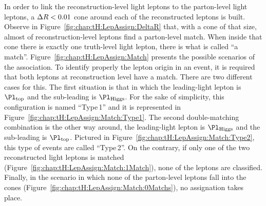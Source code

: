 In order to link the reconstruction-level light leptons to the parton-level light leptons, a \(\Delta R < 0.01\) cone around
each of the reconstructed leptons is built. Observe in Figure~\ref{fig:chap:tH:LepAssign:DeltaR} that, with a cone
of that size, almost of reconstruction-level leptons find a parton-level match.
When inside that cone there is exactly one truth-level light lepton,
there is what is called ``a match''. Figure~\ref{fig:chap:tH:LepAssign:Match} presents the possible scenarios
of the association. To identify properly the lepton origin in an event, it is required that both leptons
at reconstruction level have a match. There are two different cases for this.
The first situation is that in which the leading-light lepton is $\Pl_{\text{top}}$ and the sub-leading is $\Pl_{\text{Higgs}}$. For the 
sake of simplicity, this configuration is named ``Type$\,$1'' and it is represented in Figure~\ref{fig:chap:tH:LepAssign:Match:Type1}.
The second double-matching combination is the other way around, the leading-light lepton is $\Pl_{\text{Higgs}}$ and the sub-leading 
is $\Pl_{\text{top}}$. Pictured in Figure~\ref{fig:chap:tH:LepAssign:Match:Type2}, this type of events are called ``Type$\,$2''.
On the contrary, if only one of the two reconstructed light leptons is matched (Figure~\ref{fig:chap:tH:LepAssign:Match:1Match}),
none of the leptons are classified. %
Finally, in the scenario in which none of the parton-level leptons fall into the cones (Figure~\ref{fig:chap:tH:LepAssign:Match:0Matchs}), 
no assignation takes place. 


